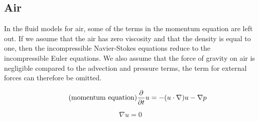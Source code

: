 \subsection{Air}

In the fluid models for air, some of the terms in the momentum equation are left 
out. If we assume that the air has zero viscosity and that the density is equal 
to one, then the incompressible Navier-Stokes equations reduce to the incompressible 
Euler equations. We also assume that the force of gravity on air is negligible 
compared to the advection and pressure terms, the term for external forces can 
therefore be omitted\cite{originalSnowThesis}. 

\begin{equation} 
	\tag{momentum equation}
	\frac{\partial}{\partial t}u  = -(u \cdot \nabla)u - \nabla p
\end{equation}

\begin{equation}
	\tag{continuity equation}
	\nabla u = 0
\end{equation}
